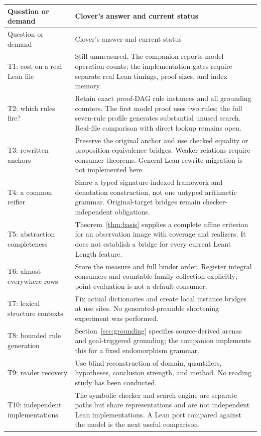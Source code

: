 \documentclass[11pt,a4paper]{article}
\theoremstyle{definition}
\theoremstyle{remark}
\begin{document}
\begin{center}\small
\begin{longtable}{@{}P{.28\textwidth}P{.63\textwidth}@{}}
\toprule
Question or demand & Clover's answer and current status\\\midrule\endfirsthead
\toprule Question or demand & Clover's answer and current status\\\midrule\endhead
\bottomrule\endfoot
T1: cost on a real Lean file & Still unmeasured. The companion reports model operation counts; the implementation gates require separate real Lean timings, proof sizes, and index memory.\\
T2: which rules fire? & Retain exact proof-DAG rule instances and all grounding counters. The first model proof uses two rules; the full seven-rule profile generates substantial unused search. Real-file comparison with direct lookup remains open.\\
T3: rewritten anchors & Preserve the original anchor and use checked equality or proposition-equivalence bridges. Weaker relations require consumer theorems. General Lean rewrite migration is not implemented here.\\
T4: a common reifier & Share a typed signature-indexed framework and denotation construction, not one untyped arithmetic grammar. Original-target bridges remain checker-independent obligations.\\
T5: abstraction completeness & Theorem~\ref{thm:basis} supplies a complete affine criterion for an observation image with coverage and realizers. It does not establish a bridge for every current Leant Length feature.\\
T6: almost-everywhere rows & Store the measure and full binder order. Register integral consumers and countable-family collection explicitly; point evaluation is not a default consumer.\\
T7: lexical structure contexts & Fix actual dictionaries and create local instance bridges at use sites. No generated-preamble shortening experiment was performed.\\
T8: bounded rule generation & Section~\ref{sec:grounding} specifies source-derived arenas and goal-triggered grounding; the companion implements this for a fixed endomorphism grammar.\\
T9: reader recovery & Use blind reconstruction of domain, quantifiers, hypotheses, conclusion strength, and method. No reading study has been conducted.\\
T10: independent implementations & The symbolic checker and search engine are separate paths but share representations and are not independent Lean implementations. A Lean port compared against the model is the next useful comparison.\\

\end{longtable}
\end{center}
\end{document}
